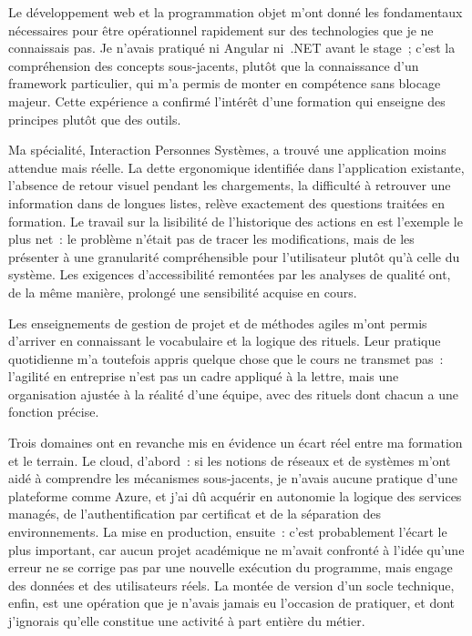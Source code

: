 Le développement web et la programmation objet m'ont donné les fondamentaux
nécessaires pour être opérationnel rapidement sur des technologies que je ne
connaissais pas. Je n'avais pratiqué ni Angular ni~.NET avant le stage~; c'est
la compréhension des concepts sous-jacents, plutôt que la connaissance d'un
framework particulier, qui m'a permis de monter en compétence sans blocage
majeur. Cette expérience a confirmé l'intérêt d'une formation qui enseigne des
principes plutôt que des outils.

Ma spécialité, Interaction Personnes Systèmes, a trouvé une application moins
attendue mais réelle. La dette ergonomique identifiée dans l'application
existante, l'absence de retour visuel pendant les chargements, la difficulté à
retrouver une information dans de longues listes, relève exactement des
questions traitées en formation. Le travail sur la lisibilité de l'historique
des actions en est l'exemple le plus net~: le problème n'était pas de tracer les
modifications, mais de les présenter à une granularité compréhensible pour
l'utilisateur plutôt qu'à celle du système. Les exigences d'accessibilité
remontées par les analyses de qualité ont, de la même manière, prolongé une
sensibilité acquise en cours.

Les enseignements de gestion de projet et de méthodes agiles m'ont permis
d'arriver en connaissant le vocabulaire et la logique des rituels. Leur pratique
quotidienne m'a toutefois appris quelque chose que le cours ne transmet pas~:
l'agilité en entreprise n'est pas un cadre appliqué à la lettre, mais une
organisation ajustée à la réalité d'une équipe, avec des rituels dont chacun
a une fonction précise.

Trois domaines ont en revanche mis en évidence un écart réel entre ma formation
et le terrain. Le cloud, d'abord~: si les notions de réseaux et de systèmes
m'ont aidé à comprendre les mécanismes sous-jacents, je n'avais aucune pratique
d'une plateforme comme Azure, et j'ai dû acquérir en autonomie la logique des
services managés, de l'authentification par certificat et de la séparation des
environnements. La mise en production, ensuite~: c'est probablement l'écart le
plus important, car aucun projet académique ne m'avait confronté à l'idée qu'une
erreur ne se corrige pas par une nouvelle exécution du programme, mais engage
des données et des utilisateurs réels. La montée de version d'un socle
technique, enfin, est une opération que je n'avais jamais eu l'occasion de
pratiquer, et dont j'ignorais qu'elle constitue une activité à part entière du
métier.

